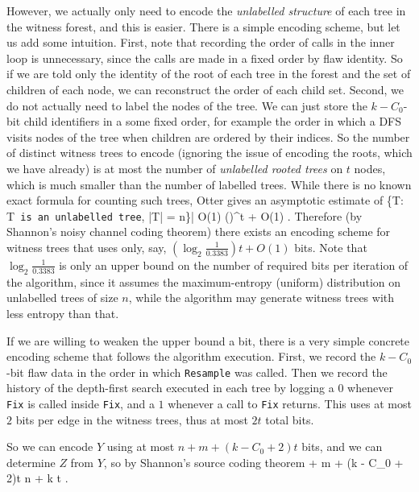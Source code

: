 \documentclass{article}
\def\seqn#1\eeqn{\begin{align}#1\end{align}}
\begin{document}
However, we actually only need to encode the \emph{unlabelled structure} of each tree in the witness forest, and this is easier.  There is a simple encoding scheme, but let us add some intuition.  First, note that recording the order of calls in the inner loop is unnecessary, since the calls are made in a fixed order by flaw identity.  So if we are told only the identity of the root of each tree in the forest and the set of children of each node, we can reconstruct the order of each child set.  %
Second, we do not actually need to label the nodes of the tree.  We can just store the $k-C_0$-bit child identifiers in a some fixed order, for example the order in which a DFS visits nodes of the tree when children are ordered by their indices. %
So the number of distinct witness trees to encode (ignoring the issue of encoding the roots, which we have already) is at most the number of \emph{unlabelled rooted trees} on $t$ nodes, which is much smaller than the number of labelled trees.  While there is no known exact formula for counting such trees, Otter \cite{otter1948number} gives an asymptotic estimate of
\seqn
  |\{T: T\texttt{ is an unlabelled tree}, |T| = n\}| \tilde O(1) ()^t + O(1) .
\eeqn
Therefore (by Shannon's noisy channel coding theorem) there exists an encoding scheme for witness trees that uses only, say, $(\log_2 \frac{1}{0.3383}) t + O(1)$ bits.  Note that $\log_2 \frac{1}{0.3383}$ is only an upper bound on the number of required bits per iteration of the algorithm, since it assumes the maximum-entropy (uniform) distribution on unlabelled trees of size $n$, while the algorithm may generate witness trees with less entropy than that.

If we are willing to weaken the upper bound a bit, there is a very simple concrete encoding scheme that follows the algorithm execution.  First, we record the $k-C_0$-bit flaw data in the order in which \texttt{Resample} was called.  Then we record the history of the depth-first search executed in each tree by logging a $0$ whenever \texttt{Fix} is called inside \texttt{Fix}, and a $1$ whenever a call to \texttt{Fix} returns.  This uses at most $2$ bits per edge in the witness trees, thus at most $2t$ total bits.

So we can encode $Y$ using at most $n + m + (k - C_0 + 2)t$ bits, and we can determine $Z$ from $Y$, so by Shannon's source coding theorem
\seqn
  n + m + (k - C_0 + 2)t \leq n + k t \label{eqn:ksat-entropy-inequality}.
\eeqn
\end{document}
